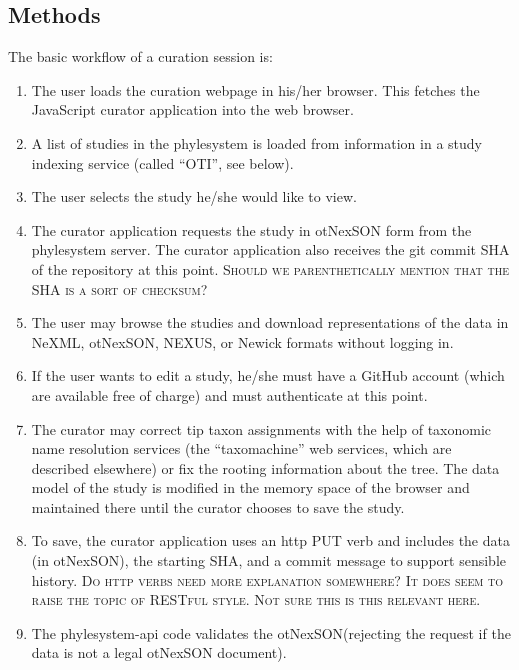 \documentclass{bioinfo}
\newcommand{\ps}{phylesystem\xspace}
\newcommand{\nexson}{otNexSON\xspace}
\newcommand{\js}{JavaScript\xspace}
\newcommand{\ejmcomment}[1]{{\color{green} \textsc{#1}}\xspace}
\newcommand{\jfacomment}[1]{{\color{orange} \textsc{#1}}\xspace}
\begin{document}
\begin{methods}
\section{Methods}
The basic workflow of a curation session is:
\begin{enumerate}
    \item \label{loadAppStep} The user loads the curation webpage in his/her browser.  This fetches the \js curator application into the web browser.
    \item \label{otiListStep} A list of studies in the \ps is loaded from information in a study indexing service (called ``OTI'', see below).
    \item The user selects the study he/she would like to view.
    \item \label{getStudyStep} The curator application requests the study in \nexson form from the \ps server.
        The curator application also receives the git commit SHA of the repository at this point.
        \jfacomment{Should we parenthetically mention that the SHA is a sort of checksum?}
    \item \label{browseStep} The user may browse the studies and download representations of the data in NeXML, \nexson, NEXUS\cite{NEXUS}, or Newick formats without logging in.
    \item \label{authStep} If the user wants to edit a study, he/she must have a GitHub account (which are available free of charge) and must authenticate at this point.
    \item \label{userEditStep} The curator may correct tip taxon assignments with the help of taxonomic name resolution services (the ``taxomachine'' web services, which are described
        elsewhere) or fix the rooting information about the tree. The data model of the study is modified in the memory space of the 
        browser and maintained there until the curator chooses to save the study.
    \item \label{putStep} To save, the curator application uses an http PUT verb and includes the data (in \nexson), the starting SHA, and a commit message to support sensible history. 
        \ejmcomment{Do http verbs need more explanation somewhere?} 
        \jfacomment{It does seem to raise the topic of RESTful style. Not sure this is this relevant here.}
    \item \label{validateStep} The \ps-api code validates the \nexson (rejecting the request if the data is not a legal \nexson document).

\end{enumerate}
\end{methods}
\end{document}
